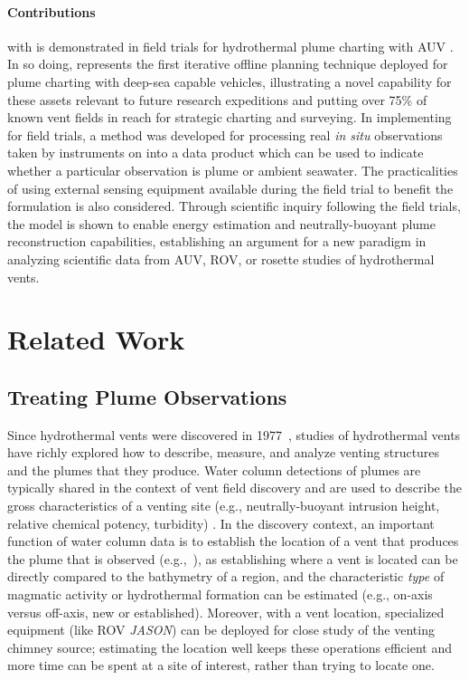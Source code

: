 \paragraph{Contributions}
\PHORTEX with \PHUMES is demonstrated in field trials for hydrothermal plume charting with AUV \Sentry. In so doing, \PHORTEX represents the first iterative offline planning technique deployed for plume charting with deep-sea capable vehicles, illustrating a novel capability for these assets relevant to future research expeditions and putting over 75\% of known vent fields \autocite{beaulieu2013authoritative} in reach for strategic charting and surveying. In implementing \PHORTEX for field trials, a method was developed for processing real \emph{in situ} observations taken by instruments on \Sentry into a data product which can be used to indicate whether a particular observation is plume or ambient seawater. The practicalities of using external sensing equipment available during the field trial to benefit the \PHUMES formulation is also considered. Through scientific inquiry following the field trials, the \PHUMES model is shown to enable energy estimation and neutrally-buoyant plume reconstruction capabilities, establishing an argument for a new paradigm in analyzing scientific data from AUV, ROV, or rosette studies of hydrothermal vents.  


\section{Related Work}
\label{sec:field_rw}
\subsection{Treating Plume Observations}
Since hydrothermal vents were discovered in 1977~\autocite{corliss1979submarine}, studies of hydrothermal vents have richly explored how to describe, measure, and analyze venting structures and the plumes that they produce. Water column detections of plumes are typically shared in the context of vent field discovery and are used to describe the gross characteristics of a venting site (e.g., neutrally-buoyant intrusion height, relative chemical potency, turbidity) \autocite{kim2020discovery,caratori2012crustal,baker2019posteruption}. In the discovery context, an important function of water column data is to establish the location of a vent that produces the plume that is observed (e.g.,~\cite{jakuba2007stochastic,branch2020demonstration, jakuba2008autonomous}), as establishing where a vent is located can be directly compared to the bathymetry of a region, and the characteristic \emph{type} of magmatic activity or hydrothermal formation can be estimated (e.g., on-axis versus off-axis, new or established). Moreover, with a vent location, specialized equipment (like ROV \emph{JASON}) can be deployed for close study of the venting chimney source; estimating the location well keeps these operations efficient and more time can be spent at a site of interest, rather than trying to locate one.

